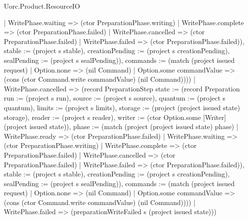 \begin{lexlean}{Uorc.Product.ResourceIO}
\begin{semanticmodule}
{{{      | WritePhase.waiting => (ctor PreparationPhase.writing)
      | WritePhase.complete => (ctor PreparationPhase.failed)
      | WritePhase.cancelled => (ctor PreparationPhase.failed)
      | WritePhase.failed => (ctor PreparationPhase.failed)), stable := (project s stable), creationPending := (project s creationPending), sealPending := (project s sealPending)}), commands := (match (project issued request)
      | Option.none => (nil Command)
      | Option.some commandValue => (cons (ctor Command.write commandValue) (nil Command)))})
    | WritePhase.cancelled => (record PreparationStep {state := (record Preparation {run := (project s run), source := (project s source), quantum := (project s quantum), limits := (project s limits), storage := (project (project issued state) storage), reader := (project s reader), writer := (ctor Option.some [Writer] (project issued state)), phase := (match (project (project issued state) phase)
      | WritePhase.ready => (ctor PreparationPhase.failed)
      | WritePhase.waiting => (ctor PreparationPhase.writing)
      | WritePhase.complete => (ctor PreparationPhase.failed)
      | WritePhase.cancelled => (ctor PreparationPhase.failed)
      | WritePhase.failed => (ctor PreparationPhase.failed)), stable := (project s stable), creationPending := (project s creationPending), sealPending := (project s sealPending)}), commands := (match (project issued request)
      | Option.none => (nil Command)
      | Option.some commandValue => (cons (ctor Command.write commandValue) (nil Command)))})
    | WritePhase.failed => (preparationWriteFailed s (project issued state)))
}


\end{semanticmodule}
\end{lexlean}
